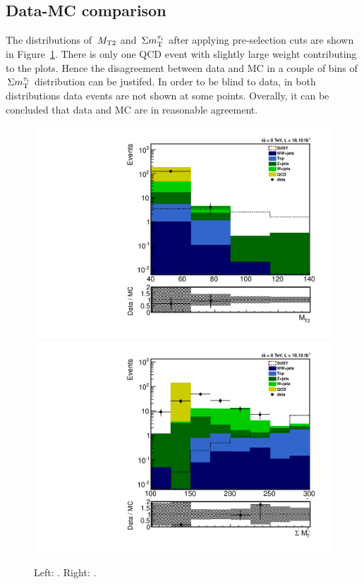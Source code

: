 \subsection{Data-MC comparison}
The distributions of $\,{M_{\rm T2}}$ and $\,\Sigma m_{\rm T}^{\tau_i}$ after applying pre-selection cuts are shown in Figure~\ref{fig:comparison}. There is only one QCD event with slightly large weight contributing to the plots. Hence the disagreement between data and MC in a couple of bins of $\,\Sigma m_{\rm T}^{\tau_i}$ distribution can be justifed. In order to be blind to data, in both distributions data events are not shown at some points. Overally, it can be concluded that data and MC are in reasonable agreement. 
\begin{figure}[htbp]
\centering
\includegraphics[angle=0,scale=0.35]{TauTauFigs/MT2_4bins.pdf}
\includegraphics[angle=0,scale=0.35]{TauTauFigs/SumMT_8bins.pdf} \\
\caption{Left: \mttwo. Right: \SumMT.}
\label{fig:comparison}
\end{figure}
